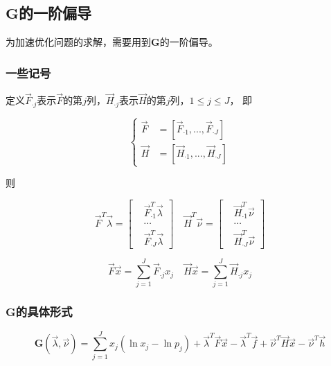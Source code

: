 \subsection{$\mathbf{G}$的一阶偏导}
为加速优化问题的求解，需要用到$\mathbf{G}$的一阶偏导。
\subsubsection{一些记号}
定义$\vec{F}_{\cdot j}$表示$\vec{F}$的第$j$列，$\vec{H}_{\cdot j}$表示$\vec{H}$的第$j$列，$1\leq j \leq J$， 即

\begin{equation}
    \left\{
    \begin{aligned}
        \vec{F} & = [\vec{F}_{\cdot 1}, ..., \vec{F}_{\cdot J}] \\
        \vec{H} & = [\vec{H}_{\cdot 1}, ..., \vec{H}_{\cdot J}]
    \end{aligned}
    \right.
\end{equation}

则

\begin{equation*}
    \vec{F}^T\vec{\lambda} = \left[
        \begin{aligned}
             & \vec{F}_{\cdot 1}^T\vec{\lambda} \\
             & \cdots                           \\
             & \vec{F}_{\cdot J}^T\vec{\lambda}
        \end{aligned}
        \right] \quad
    \vec{H}^T\vec{\nu} = \left[
        \begin{aligned}
             & \vec{H}_{\cdot 1}^T\vec{\nu} \\
             & \cdots                       \\
             & \vec{H}_{\cdot J}^T\vec{\nu}
        \end{aligned}
        \right]
\end{equation*}

\begin{equation*}
    \vec{F}\vec{x} = \sum_{j=1}^J\vec{F}_{\cdot j}x_j \quad \vec{H}\vec{x} = \sum_{j=1}^J\vec{H}_{\cdot j}x_j
\end{equation*}

\subsubsection{$\mathbf{G}$的具体形式}
\begin{equation}
    \mathbf{G}(\vec{\lambda},\vec{\nu}) = \sum_{j=1}^Jx_j(\ln x_j-\ln p_j)+\vec{\lambda}^T\vec{F}\vec{x}-\vec{\lambda}^T\vec{f} + \vec{\nu}^T\vec{H}\vec{x}-\vec{\nu}^T\vec{h}
\end{equation}

